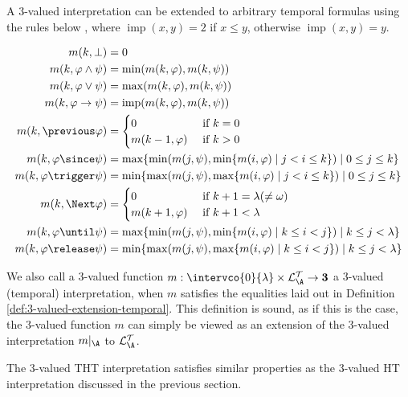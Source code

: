 A 3-valued interpretation can be extended to arbitrary temporal
formulas using the rules below \cite{agcadipescscvi20a}, where
$\operatorname{imp}(x,y)=2$ if $x \leq y$, otherwise
$\operatorname{imp}(x,y)=y$.
\begin{definition}\label{def:3-valued-extension-temporal}
\begin{align*}
  m(k, \perp) &= 0 \\
  m(k, \varphi \wedge \psi) &= \min (m(k, \varphi), m(k, \psi)) \\
  m(k, \varphi \vee \psi) &= \max (m(k, \varphi), m(k, \psi)) \\
  m(k, \varphi \rightarrow \psi) &= \operatorname{imp}(m(k, \varphi), m(k, \psi)) \\
  m(k, \previous \varphi) &= \begin{cases}
    0 & \text { if } k=0 \\
    m(k-1, \varphi) & \text { if } k>0
  \end{cases} \\
 m(k, \varphi \since \psi) &= \max \{\min (m(j, \psi), \min \{m(i, \varphi) \mid j<i \leq k\}) \mid 0 \leq j \leq k\} \\
 m(k, \varphi \trigger \psi) &= \min \{\max (m(j, \psi), \max \{m(i, \varphi) \mid j<i \leq k\}) \mid 0 \leq j \leq k\} \\
 m(k, \Next \varphi) &= \begin{cases}0 & \text { if } k+1=\lambda(\neq \omega) \\
m(k+1, \varphi) & \text { if } k+1<\lambda\end{cases} \\
 m(k, \varphi \until \psi) &= \max \{\min (m(j, \psi), \min \{m(i, \varphi) \mid k \leq i<j\}) \mid k \leq j<\lambda\} \\
 m(k, \varphi \release \psi) &= \min \{\max (m(j, \psi), \max \{m(i, \varphi) \mid k \leq i<j\}) \mid k \leq j<\lambda\}
\end{align*}
\end{definition}

We also call a 3-valued function
$m: \intervco{0}{\lambda} \times \langat \rightarrow
\textbf{3}$ a 3-valued (temporal) interpretation, when $m$ satisfies
the equalities laid out in Definition
\ref{def:3-valued-extension-temporal}. This definition is sound, as if
this is the case, the 3-valued function $m$ can simply be viewed as an
extension of the 3-valued interpretation $m\vert_\A$ to
$\langat$.

The 3-valued THT interpretation satisfies similar properties as the
3-valued HT interpretation discussed in the previous section.

